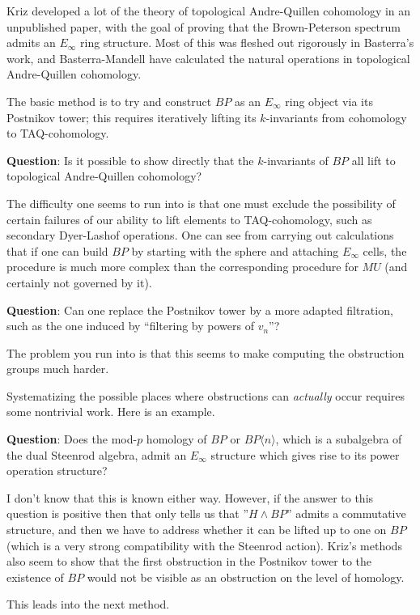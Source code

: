 \documentclass[12pt,titlepage]{article}
\theoremstyle{plain}
\theoremstyle{definition}
\theoremstyle{remark}
\begin{document}
Kriz developed a lot of the theory of topological Andre-Quillen cohomology in an unpublished paper, with the goal of proving that the Brown-Peterson spectrum admits an $E_\infty$ ring structure. Most of this was fleshed out rigorously in Basterra'{}s work, and Basterra-Mandell have calculated the natural operations in topological Andre-Quillen cohomology.

The basic method is to try and construct $BP$ as an $E_\infty$ ring object via its Postnikov tower; this requires iteratively lifting its $k$-invariants from cohomology to TAQ-cohomology.

\textbf{Question}: Is it possible to show directly that the $k$-invariants of $BP$ all lift to topological Andre-Quillen cohomology?

The difficulty one seems to run into is that one must exclude the possibility of certain failures of our ability to lift elements to TAQ-cohomology, such as secondary Dyer-Lashof operations. One can see from carrying out calculations that if one can build $BP$ by starting with the sphere and attaching $E_\infty$ cells, the procedure is much more complex than the corresponding procedure for $MU$ (and certainly not governed by it).

\textbf{Question}: Can one replace the Postnikov tower by a more adapted filtration, such as the one induced by ``{}filtering by powers of $v_n$''{}?

The problem you run into is that this seems to make computing the obstruction groups much harder.

Systematizing the possible places where obstructions can \emph{actually} occur requires some nontrivial work. Here is an example.

\textbf{Question}: Does the mod-$p$ homology of $BP$ or $BP\langle
n\rangle$, which is a subalgebra of the dual Steenrod algebra, admit an $E_\infty$ structure which gives rise to its power operation structure?

I don'{}t know that this is known either way. However, if the answer to this question is positive then that only tells us that ''{}$H \wedge BP$''{} admits a commutative structure, and then we have to address whether it can be lifted up to one on $BP$ (which is a very strong compatibility with the Steenrod action). Kriz'{}s methods also seem to show that the first obstruction in the Postnikov tower to the existence of $BP$ would not be visible as an obstruction on the level of homology.

This leads into the next method.
\end{document}

